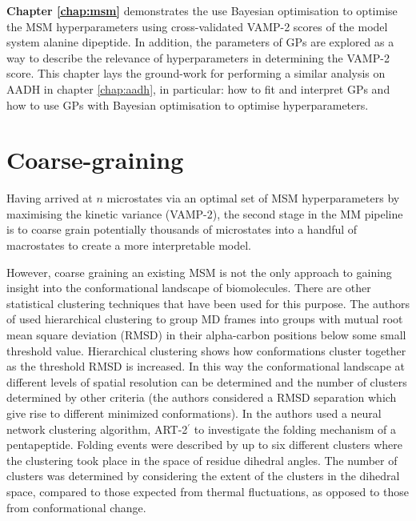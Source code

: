 \textbf{Chapter \ref{chap:msm}} demonstrates the use Bayesian optimisation to optimise the MSM hyperparameters using cross-validated VAMP-2 scores of the model system alanine dipeptide. In addition, the parameters of GPs are explored as a way to describe the relevance of hyperparameters in determining the VAMP-2 score. This chapter lays the ground-work for performing a similar analysis on AADH in chapter \ref{chap:aadh}, in particular: how to fit and interpret GPs and how to use GPs with Bayesian optimisation to optimise hyperparameters. 

\section{Coarse-graining}\label{sec:intro_coarse}

Having arrived at $n$ microstates via an optimal set of MSM hyperparameters by maximising the kinetic variance (VAMP-2), the second  stage in the MM pipeline is to coarse grain potentially thousands of microstates into a handful of macrostates to create a more interpretable model. 

However, coarse graining an existing MSM is not the only approach to gaining insight into the conformational landscape of biomolecules.  There are other statistical clustering techniques that have been used for this purpose. The authors of \cite{troyerProteinConformationalLandscapes1995} used hierarchical clustering \cite[chapter 10 of]{friedman2001elements} to group MD frames into groups with mutual root mean square deviation (RMSD) in their alpha-carbon positions below some small threshold value. Hierarchical clustering shows how conformations cluster together as the threshold RMSD is increased.  In this way the conformational landscape at different levels of spatial resolution can be determined and the number of clusters determined by other criteria (the authors considered a RMSD separation which give rise to different minimized conformations).  In \cite{karpen1993statistical} the authors used a neural network clustering algorithm, ART-2$^{\prime}$ \cite{carpenterARTSelforganizationStable1987} to investigate the folding mechanism of a pentapeptide. Folding events were described by up to six different clusters where the clustering took place in the space of residue dihedral angles. The number of clusters was determined by considering the extent of the clusters in the dihedral space, compared to those expected from thermal fluctuations, as opposed to those from conformational change. 

